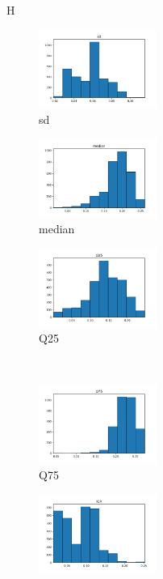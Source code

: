 \documentclass[a4paper]{article}    %
\begin{document}
\begin{figure}{H}
    \centering
    \begin{subfigure}{0.32\textwidth}
        \centering
        \includegraphics[width=3.85cm]{raw_0_sd}
        \caption{sd}
        \label{fig:sub_raw_1}
    \end{subfigure}
    \hfill
    \begin{subfigure}{0.32\textwidth}
        \centering
        \includegraphics[width=3.85cm]{raw_1_median}
        \caption{median}
        \label{fig:sub_raw_2}
    \end{subfigure}
    \hfill
    \begin{subfigure}{0.32\textwidth}
        \centering
        \includegraphics[width=3.85cm]{raw_2_Q25}
        \caption{Q25}
        \label{fig:sub_raw_3}
    \end{subfigure}%
    \\
    \begin{subfigure}{0.32\textwidth}
        \centering
        \includegraphics[width=3.85cm]{raw_3_Q75}
        \caption{Q75}
        \label{fig:sub_raw_4}
    \end{subfigure}\hfill
    \begin{subfigure}{0.32\textwidth}
        \centering
        \includegraphics[width=3.85cm]{raw_4_IQR}

\end{subfigure}
\end{figure}
\end{document}
